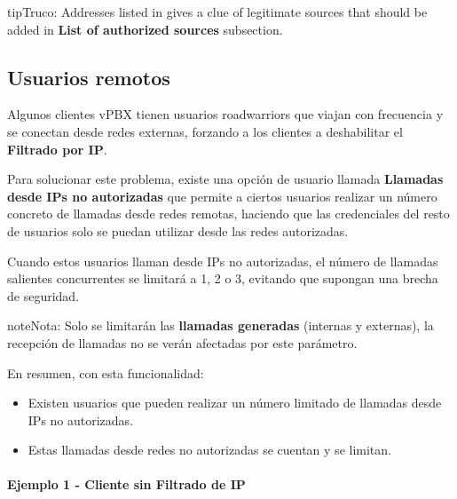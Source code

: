 \documentclass[letterpaper,10pt,spanish]{sphinxmanual}
\begin{document}
\begin{notice}{tip}{Truco:}
Addresses listed in {\hyperref[administration_portal/brand/views/ipfilter_blocked_addresses:ip\string-filter\string-blocked\string-addresses]{}} gives a clue of legitimate sources that should be
added in \textbf{List of authorized sources} subsection.
\end{notice}


\subsection{Usuarios remotos}
\label{security_and_maintenance/security/authorized_ip_ranges:id2}\label{security_and_maintenance/security/authorized_ip_ranges:roadwarrior-users}
Algunos clientes vPBX tienen usuarios roadwarriors que viajan con frecuencia y se conectan desde redes externas, forzando a los clientes a deshabilitar el \textbf{Filtrado por IP}.

Para solucionar este problema, existe una opción de usuario llamada \textbf{Llamadas desde IPs no autorizadas} que permite a ciertos usuarios realizar un número concreto de llamadas desde redes remotas, haciendo que las credenciales del resto de usuarios solo se puedan utilizar desde las redes autorizadas.

Cuando estos usuarios llaman desde IPs no autorizadas, el número de llamadas salientes concurrentes se limitará a 1, 2 o 3, evitando que supongan una brecha de seguridad.

\begin{notice}{note}{Nota:}
Solo se limitarán las \textbf{llamadas generadas} (internas y externas), la recepción de llamadas no se verán afectadas por este parámetro.
\end{notice}

En resumen, con esta funcionalidad:
\begin{itemize}
\item {} 
Existen usuarios que pueden realizar un número limitado de llamadas desde IPs no autorizadas.

\item {} 
Estas llamadas desde redes no autorizadas se cuentan y se limitan.

\end{itemize}
\paragraph{Ejemplo 1 - Cliente sin Filtrado de IP}
\end{document}
